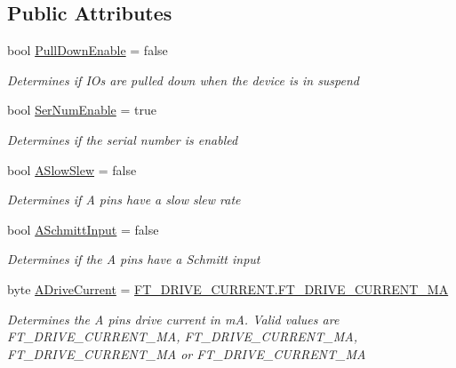\subsection*{Public Attributes}
\begin{DoxyCompactItemize}
\item 
bool \mbox{\hyperlink{class_f_t_d2_x_x___n_e_t_1_1_f_t_d_i_1_1_f_t4232_h___e_e_p_r_o_m___s_t_r_u_c_t_u_r_e_a3fa23f31965f05e024a752a94e584464}{Pull\+Down\+Enable}} = false
\begin{DoxyCompactList}\small\item\em Determines if I\+Os are pulled down when the device is in suspend \end{DoxyCompactList}\item 
bool \mbox{\hyperlink{class_f_t_d2_x_x___n_e_t_1_1_f_t_d_i_1_1_f_t4232_h___e_e_p_r_o_m___s_t_r_u_c_t_u_r_e_a7838c1b827085f44a84cc418e9adfdbe}{Ser\+Num\+Enable}} = true
\begin{DoxyCompactList}\small\item\em Determines if the serial number is enabled \end{DoxyCompactList}\item 
bool \mbox{\hyperlink{class_f_t_d2_x_x___n_e_t_1_1_f_t_d_i_1_1_f_t4232_h___e_e_p_r_o_m___s_t_r_u_c_t_u_r_e_acf6ae2e3a6c12eda640b246546484e00}{A\+Slow\+Slew}} = false
\begin{DoxyCompactList}\small\item\em Determines if A pins have a slow slew rate \end{DoxyCompactList}\item 
bool \mbox{\hyperlink{class_f_t_d2_x_x___n_e_t_1_1_f_t_d_i_1_1_f_t4232_h___e_e_p_r_o_m___s_t_r_u_c_t_u_r_e_a4f6a1cb9b3a164afc7e9a991cebeeb69}{A\+Schmitt\+Input}} = false
\begin{DoxyCompactList}\small\item\em Determines if the A pins have a Schmitt input \end{DoxyCompactList}\item 
byte \mbox{\hyperlink{class_f_t_d2_x_x___n_e_t_1_1_f_t_d_i_1_1_f_t4232_h___e_e_p_r_o_m___s_t_r_u_c_t_u_r_e_aa46794d26e6116a8d72e7ca8431612e9}{A\+Drive\+Current}} = \mbox{\hyperlink{class_f_t_d2_x_x___n_e_t_1_1_f_t_d_i_1_1_f_t___d_r_i_v_e___c_u_r_r_e_n_t_af6b404bcc6f2eb88bbc95b183d5729ea}{F\+T\+\_\+\+D\+R\+I\+V\+E\+\_\+\+C\+U\+R\+R\+E\+N\+T.\+F\+T\+\_\+\+D\+R\+I\+V\+E\+\_\+\+C\+U\+R\+R\+E\+N\+T\+\_\+MA}}
\begin{DoxyCompactList}\small\item\em Determines the A pins drive current in mA. Valid values are F\+T\+\_\+\+D\+R\+I\+V\+E\+\_\+\+C\+U\+R\+R\+E\+N\+T\+\_\+MA, F\+T\+\_\+\+D\+R\+I\+V\+E\+\_\+\+C\+U\+R\+R\+E\+N\+T\+\_\+MA, F\+T\+\_\+\+D\+R\+I\+V\+E\+\_\+\+C\+U\+R\+R\+E\+N\+T\+\_\+MA or F\+T\+\_\+\+D\+R\+I\+V\+E\+\_\+\+C\+U\+R\+R\+E\+N\+T\+\_\+MA \end{DoxyCompactList}\item 

\end{DoxyCompactItemize}
